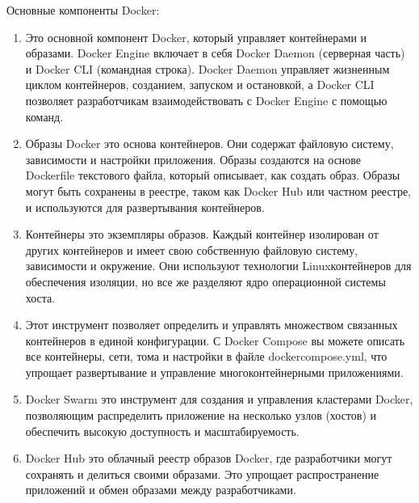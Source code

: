 \documentclass[letterpaper,10pt,russian]{sphinxmanual}
\begin{document}
\sphinxAtStartPar
Основные компоненты Docker:
\begin{enumerate}
%
\item {} 
\sphinxAtStartPar
{} Это основной компонент Docker, который управляет контейнерами и образами. Docker Engine включает в себя Docker Daemon (серверная часть) и Docker CLI (командная строка). Docker Daemon управляет жизненным циклом контейнеров, созданием, запуском и остановкой, а Docker CLI позволяет разработчикам взаимодействовать с Docker Engine с помощью команд.

\item {} 
\sphinxAtStartPar
{} Образы Docker \sphinxhyphen{} это основа контейнеров. Они содержат файловую систему, зависимости и настройки приложения. Образы создаются на основе Dockerfile \sphinxhyphen{} текстового файла, который описывает, как создать образ. Образы могут быть сохранены в реестре, таком как Docker Hub или частном реестре, и используются для развертывания контейнеров.

\item {} 
\sphinxAtStartPar
{} Контейнеры \sphinxhyphen{} это экземпляры образов. Каждый контейнер изолирован от других контейнеров и имеет свою собственную файловую систему, зависимости и окружение. Они используют технологии Linux\sphinxhyphen{}контейнеров для обеспечения изоляции, но все же разделяют ядро операционной системы хоста.

\item {} 
\sphinxAtStartPar
{} Этот инструмент позволяет определить и управлять множеством связанных контейнеров в единой конфигурации. С Docker Compose вы можете описать все контейнеры, сети, тома и настройки в файле docker\sphinxhyphen{}compose.yml, что упрощает развертывание и управление многоконтейнерными приложениями.

\item {} 
\sphinxAtStartPar
{} Docker Swarm \sphinxhyphen{} это инструмент для создания и управления кластерами Docker, позволяющим распределить приложение на несколько узлов (хостов) и обеспечить высокую доступность и масштабируемость.

\item {} 
\sphinxAtStartPar
{} Docker Hub \sphinxhyphen{} это облачный реестр образов Docker, где разработчики могут сохранять и делиться своими образами. Это упрощает распространение приложений и обмен образами между разработчиками.

\end{enumerate}
\end{document}
